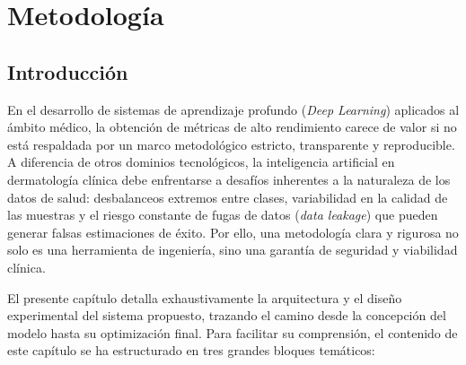 \chapter{Metodología}

\section{Introducción}

En el desarrollo de sistemas de aprendizaje profundo (\textit{Deep Learning}) aplicados al ámbito médico, la obtención de métricas de alto rendimiento carece de valor si no está respaldada por un marco metodológico estricto, transparente y reproducible. A diferencia de otros dominios tecnológicos, la inteligencia artificial en dermatología clínica debe enfrentarse a desafíos inherentes a la naturaleza de los datos de salud: desbalanceos extremos entre clases, variabilidad en la calidad de las muestras y el riesgo constante de fugas de datos (\textit{data leakage}) que pueden generar falsas estimaciones de éxito. Por ello, una metodología clara y rigurosa no solo es una herramienta de ingeniería, sino una garantía de seguridad y viabilidad clínica.

El presente capítulo detalla exhaustivamente la arquitectura y el diseño experimental del sistema propuesto, trazando el camino desde la concepción del modelo hasta su optimización final. Para facilitar su comprensión, el contenido de este capítulo se ha estructurado en tres grandes bloques temáticos:


